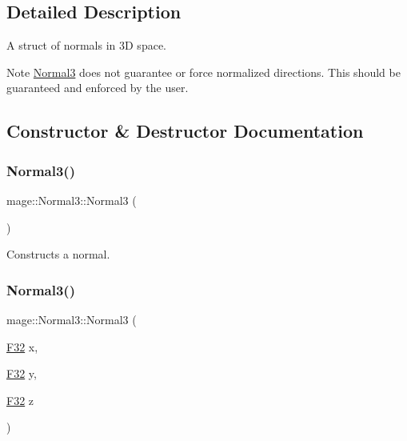 \subsection{Detailed Description}
A struct of normals in 3D space.

\begin{DoxyNote}{Note}
{\ttfamily \hyperlink{structmage_1_1_normal3}{Normal3}} does not guarantee or force normalized directions. This should be guaranteed and enforced by the user. 
\end{DoxyNote}


\subsection{Constructor \& Destructor Documentation}
\hypertarget{structmage_1_1_normal3_a64a99fa013aff357da71a39f1957e7c6}{}\label{structmage_1_1_normal3_a64a99fa013aff357da71a39f1957e7c6} 
\subsubsection{\texorpdfstring{Normal3()}{Normal3()}\hspace{0.1cm}{\footnotesize\ttfamily [1/8]}}
{\footnotesize\ttfamily mage\+::\+Normal3\+::\+Normal3 (\begin{DoxyParamCaption}{ }\end{DoxyParamCaption})\hspace{0.3cm}{\ttfamily [noexcept]}}

Constructs a normal. \hypertarget{structmage_1_1_normal3_a1e6a74b5548a443c5b8389e7d8dd3210}{}\label{structmage_1_1_normal3_a1e6a74b5548a443c5b8389e7d8dd3210} 
\subsubsection{\texorpdfstring{Normal3()}{Normal3()}\hspace{0.1cm}{\footnotesize\ttfamily [2/8]}}
{\footnotesize\ttfamily mage\+::\+Normal3\+::\+Normal3 (\begin{DoxyParamCaption}\item[{\hyperlink{namespacemage_aa97e833b45f06d60a0a9c4fc22ae02c0}{F32}}]{x,  }\item[{\hyperlink{namespacemage_aa97e833b45f06d60a0a9c4fc22ae02c0}{F32}}]{y,  }\item[{\hyperlink{namespacemage_aa97e833b45f06d60a0a9c4fc22ae02c0}{F32}}]{z }\end{DoxyParamCaption})\hspace{0.3cm}{\ttfamily [noexcept]}}

